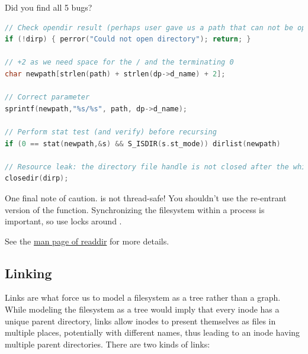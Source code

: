 Did you find all 5 bugs?

\begin{lstlisting}[language=C]
// Check opendir result (perhaps user gave us a path that can not be opened as a directory
if (!dirp) { perror("Could not open directory"); return; }

// +2 as we need space for the / and the terminating 0
char newpath[strlen(path) + strlen(dp->d_name) + 2];

// Correct parameter
sprintf(newpath,"%s/%s", path, dp->d_name);

// Perform stat test (and verify) before recursing
if (0 == stat(newpath,&s) && S_ISDIR(s.st_mode)) dirlist(newpath)

// Resource leak: the directory file handle is not closed after the while loop
closedir(dirp);
\end{lstlisting}

One final note of caution.
 is not thread-safe!
You shouldn't use the re-entrant version of the function.
Synchronizing the filesystem within a process is important, so use locks around .

See the \href{https://linux.die.net/man/3/readdir}{man page of readdir} for more details.

\subsection{Linking}

Links are what force us to model a filesystem as a tree rather than a graph.
While modeling the filesystem as a tree would imply that every inode has a unique parent directory, links allow inodes to present themselves as files in multiple places, potentially with different names, thus leading to an inode having multiple parent directories.
There are two kinds of links:

